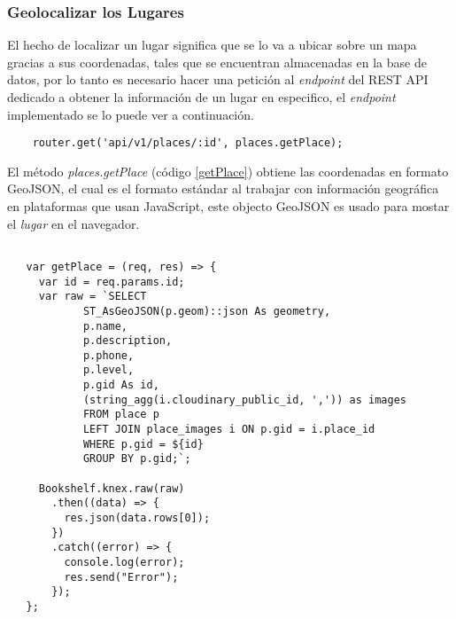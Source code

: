 

\subsubsection{Geolocalizar los Lugares}
\label{sub:fronted_lugares}

El hecho de localizar un lugar significa que se lo va a ubicar sobre un mapa gracias a sus coordenadas, tales que se encuentran almacenadas en la base de datos, por lo tanto es necesario hacer una petición al \emph{endpoint} del REST API dedicado a obtener la información de un lugar en especifico, el \emph{endpoint} implementado se lo puede ver a continuación. \\

\begin{center}
  \begin{verbatim}
    router.get('api/v1/places/:id', places.getPlace);
  \end{verbatim}
\end{center}

\newpage
El método \emph{places.getPlace} (c\'odigo \ref{getPlace}) obtiene las coordenadas en formato GeoJSON, el cual es el formato estándar al trabajar con información geográfica en plataformas que usan JavaScript, este objecto GeoJSON es usado para mostar el \emph{lugar} en el navegador. \\

\begin{center}
 \begin{lstlisting}[label=getPlace,caption=Método para obtener la información de un lugar.]

   var getPlace = (req, res) => {
     var id = req.params.id;
     var raw = `SELECT
            ST_AsGeoJSON(p.geom)::json As geometry,
            p.name,
            p.description,
            p.phone,
            p.level,
            p.gid As id,
            (string_agg(i.cloudinary_public_id, ',')) as images
            FROM place p
            LEFT JOIN place_images i ON p.gid = i.place_id
            WHERE p.gid = ${id}
            GROUP BY p.gid;`;

     Bookshelf.knex.raw(raw)
       .then((data) => {
         res.json(data.rows[0]);
       })
       .catch((error) => {
         console.log(error);
         res.send("Error");
       });
   };

 \end{lstlisting}
\end{center}



